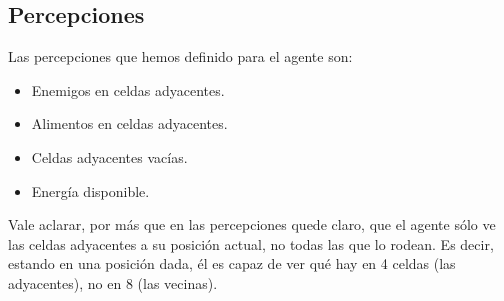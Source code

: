 \subsection{Percepciones}

Las percepciones que hemos definido para el agente son:

\begin{itemize}
\item Enemigos en celdas adyacentes.
\item Alimentos en celdas adyacentes.
\item Celdas adyacentes vacías.
\item Energía disponible.
\end{itemize}

Vale aclarar, por más que en las percepciones quede claro, que el agente sólo
ve las celdas adyacentes a su posición actual, no todas las que lo rodean. Es
decir, estando en una posición dada, él es capaz de ver qué hay en 4 celdas
(las adyacentes), no en 8 (las vecinas).
